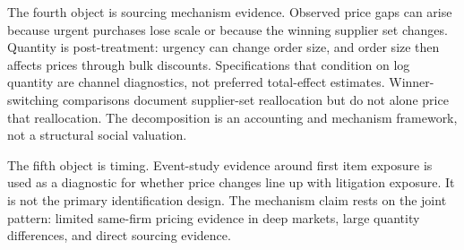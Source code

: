 The fourth object is sourcing mechanism evidence. Observed price gaps
can arise because urgent purchases lose scale or because the winning
supplier set changes. Quantity is post-treatment: urgency can change
order size, and order size then affects prices through bulk discounts.
Specifications that condition on log quantity are channel diagnostics,
not preferred total-effect estimates. Winner-switching comparisons
document supplier-set reallocation but do not alone price that
reallocation. The decomposition is an accounting and mechanism
framework, not a structural social valuation.

The fifth object is timing. Event-study evidence around first item
exposure is used as a diagnostic for whether price changes line up
with litigation exposure. It is not the primary identification design.
The mechanism claim rests on the joint pattern: limited same-firm
pricing evidence in deep markets, large quantity differences, and
direct sourcing evidence.
